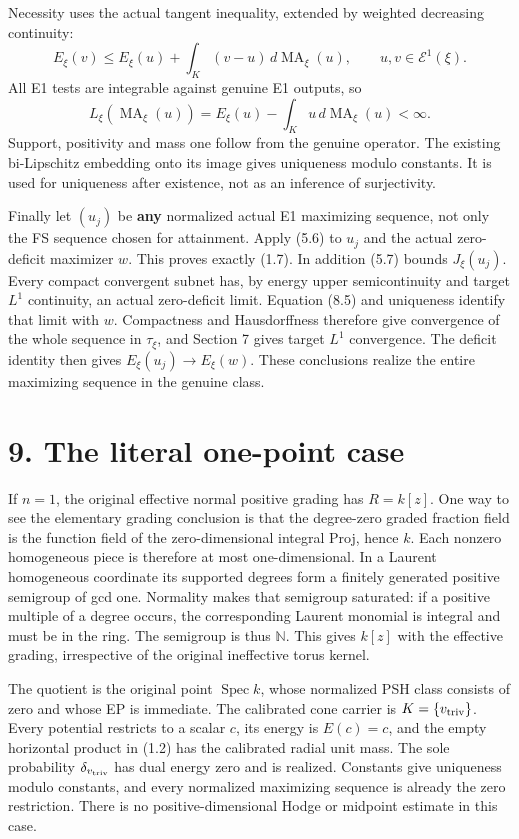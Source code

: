 \documentclass[
  10pt,
]{article}
\begin{document}
Necessity uses the actual tangent inequality, extended by weighted
decreasing continuity: \[
 E_\xi(v)\leq E_\xi(u)+\int_K(v-u)\,d\operatorname{MA}_\xi(u),
 \qquad u,v\in\mathcal E^1(\xi).
\] All E1 tests are integrable against genuine E1 outputs, so \[
 L_\xi(\operatorname{MA}_\xi(u))
                 =E_\xi(u)-\int_Ku\,d\operatorname{MA}_\xi(u)<\infty.
                                                               \tag{8.6}
\] Support, positivity and mass one follow from the genuine operator.
The existing bi-Lipschitz embedding onto its image gives uniqueness
modulo constants. It is used for uniqueness after existence, not as an
inference of surjectivity.

Finally let \((u_j)\) be \textbf{any} normalized actual E1 maximizing
sequence, not only the FS sequence chosen for attainment. Apply (5.6) to
\(u_j\) and the actual zero-deficit maximizer \(w\). This proves exactly
(1.7). In addition (5.7) bounds \(J_\xi(u_j)\). Every compact convergent
subnet has, by energy upper semicontinuity and target \(L^1\)
continuity, an actual zero-deficit limit. Equation (8.5) and uniqueness
identify that limit with \(w\). Compactness and Hausdorffness therefore
give convergence of the whole sequence in \(\tau_\xi\), and Section 7
gives target \(L^1\) convergence. The deficit identity then gives
\(E_\xi(u_j)\to E_\xi(w)\). These conclusions realize the entire
maximizing sequence in the genuine class.

\section{9. The literal one-point
case}\label{the-literal-one-point-case}

If \(n=1\), the original effective normal positive grading has
\(R=k[z]\). One way to see the elementary grading conclusion is that the
degree-zero graded fraction field is the function field of the
zero-dimensional integral Proj, hence \(k\). Each nonzero homogeneous
piece is therefore at most one-dimensional. In a Laurent homogeneous
coordinate its supported degrees form a finitely generated positive
semigroup of gcd one. Normality makes that semigroup saturated: if a
positive multiple of a degree occurs, the corresponding Laurent monomial
is integral and must be in the ring. The semigroup is thus
\(\mathbb N\). This gives \(k[z]\) with the effective grading,
irrespective of the original ineffective torus kernel.

The quotient is the original point \(\operatorname{Spec}k\), whose
normalized PSH class consists of zero and whose EP is immediate. The
calibrated cone carrier is \(K=\{v_{\rm triv}\}\). Every potential
restricts to a scalar \(c\), its energy is \(E(c)=c\), and the empty
horizontal product in (1.2) has the calibrated radial unit mass. The
sole probability \(\delta_{v_{\rm triv}}\) has dual energy zero and is
realized. Constants give uniqueness modulo constants, and every
normalized maximizing sequence is already the zero restriction. There is
no positive-dimensional Hodge or midpoint estimate in this case.
\end{document}
